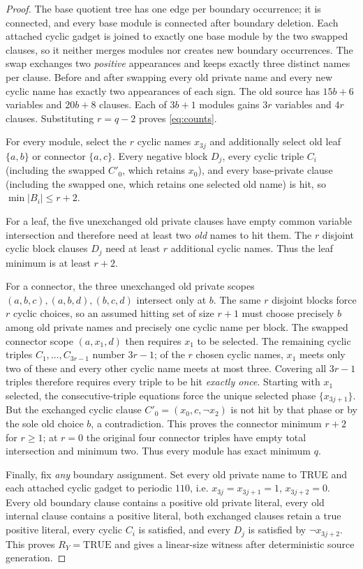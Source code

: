 \documentclass[10.5pt]{article}
\begin{document}
\begin{proof}
The base quotient tree has one edge per boundary occurrence; it is connected, and every base module is connected after boundary deletion. Each attached cyclic gadget is joined to exactly one base module by the two swapped clauses, so it neither merges modules nor creates new boundary occurrences. The swap exchanges two \emph{positive} appearances and keeps exactly three distinct names per clause. Before and after swapping every old private name and every new cyclic name has exactly two appearances of each sign. The old source has $15b+6$ variables and $20b+8$ clauses. Each of $3b+1$ modules gains $3r$ variables and $4r$ clauses. Substituting $r=q-2$ proves \eqref{eq:counts}.

For every module, select the $r$ cyclic names $x_{3j}$ and additionally select old leaf $\{a,b\}$ or connector $\{a,c\}$. Every negative block $D_j$, every cyclic triple $C_i$ (including the swapped $C'_0$, which retains $x_0$), and every base-private clause (including the swapped one, which retains one selected old name) is hit, so $\min |B_i|\le r+2$.

For a leaf, the five unexchanged old private clauses have empty common variable intersection and therefore need at least two \emph{old} names to hit them. The $r$ disjoint cyclic block clauses $D_j$ need at least $r$ additional cyclic names. Thus the leaf minimum is at least $r+2$.

For a connector, the three unexchanged old private scopes $(a,b,c),(a,b,d),(b,c,d)$ intersect only at $b$. The same $r$ disjoint blocks force $r$ cyclic choices, so an assumed hitting set of size $r+1$ must choose precisely $b$ among old private names and precisely one cyclic name per block. The swapped connector scope $(a,x_1,d)$ then requires $x_1$ to be selected. The remaining cyclic triples $C_1,\dots,C_{3r-1}$ number $3r-1$; of the $r$ chosen cyclic names, $x_1$ meets only two of these and every other cyclic name meets at most three. Covering all $3r-1$ triples therefore requires every triple to be hit \emph{exactly once}. Starting with $x_1$ selected, the consecutive-triple equations force the unique selected phase $\{x_{3j+1}\}$. But the exchanged cyclic clause $C'_0=(x_0,c,\neg x_2)$ is not hit by that phase or by the sole old choice $b$, a contradiction. This proves the connector minimum $r+2$ for $r\ge1$; at $r=0$ the original four connector triples have empty total intersection and minimum two. Thus every module has exact minimum $q$.

Finally, fix \emph{any} boundary assignment. Set every old private name to TRUE and each attached cyclic gadget to periodic $110$, i.e. $x_{3j}=x_{3j+1}=1$, $x_{3j+2}=0$. Every old boundary clause contains a positive old private literal, every old internal clause contains a positive literal, both exchanged clauses retain a true positive literal, every cyclic $C_i$ is satisfied, and every $D_j$ is satisfied by $\neg x_{3j+2}$. This proves $R_Y=\mathrm{TRUE}$ and gives a linear-size witness after deterministic source generation.
\end{proof}
\end{document}

